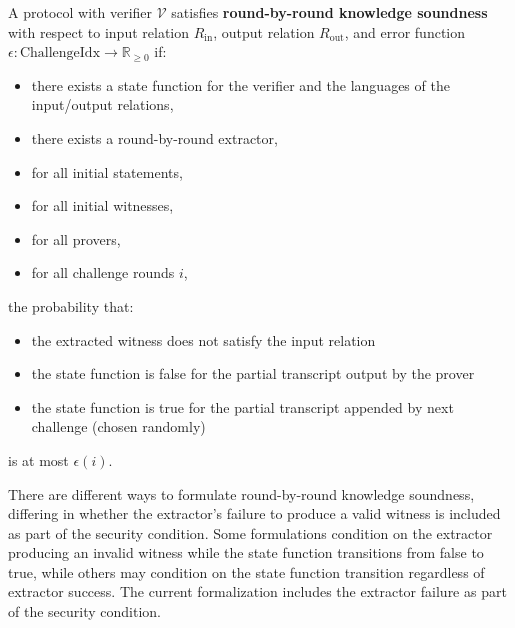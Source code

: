 \begin{definition}
    \label{def:round_by_round_knowledge_soundness}
    A protocol with verifier $\mathcal{V}$ satisfies \textbf{round-by-round knowledge soundness} with respect to input
    relation $R_{\text{in}}$, output relation $R_{\text{out}}$, and error function $\epsilon: \text{ChallengeIdx} \to \mathbb{R}_{\geq 0}$ if:
    \begin{itemize}
        \item there exists a state function for the verifier and the languages of the input/output relations,
        \item there exists a round-by-round extractor,
        \item for all initial statements,
        \item for all initial witnesses,
        \item for all provers,
        \item for all challenge rounds $i$,
    \end{itemize}
    the probability that:
    \begin{itemize}
        \item the extracted witness does not satisfy the input relation
        \item the state function is false for the partial transcript output by the prover
        \item the state function is true for the partial transcript appended by next challenge (chosen randomly)
    \end{itemize}
    is at most $\epsilon(i)$.
\end{definition}

\begin{remark}
    There are different ways to formulate round-by-round knowledge soundness, differing in whether
    the extractor's failure to produce a valid witness is included as part of the security condition.
    Some formulations condition on the extractor producing an invalid witness while the state function
    transitions from false to true, while others may condition on the state function transition
    regardless of extractor success. The current formalization includes the extractor failure as
    part of the security condition.
\end{remark}


